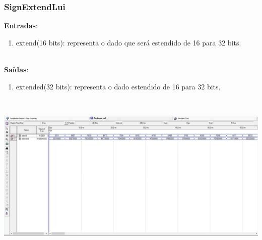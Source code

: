 \documentclass{article}
\begin{document}
    \subsubsection{SignExtendLui}
    \textbf{Entradas}:
    \begin{enumerate}
        \item extend(16 bits): representa o dado que será estendido de 16 para 32 bits.\\
    \end{enumerate}
    \\
    \textbf{Saídas}:
    \begin{enumerate}
        \item extended(32 bits): representa o dado estendido de 16 para 32 bits.\\
    \end{enumerate}\\
    \begin{center}
        \includegraphics[scale=0.4]{SignExtendLui.PNG}
    \end{center}
    \\
    \newpage
\end{document}
